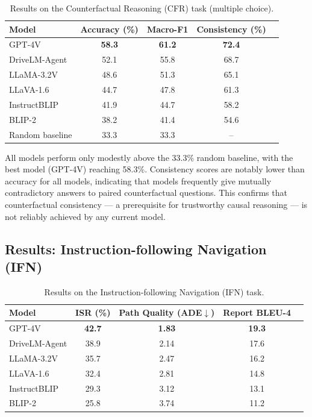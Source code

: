 \begin{table}[htbp]
  \centering
  \caption{Results on the Counterfactual Reasoning (CFR) task (multiple choice).}
  \label{tab:cfr_results}
  \small
  \begin{tabular}{lcccc}
    \toprule
    \textbf{Model} & \textbf{Accuracy (\%)} & \textbf{Macro-F1} & \textbf{Consistency (\%)} \\
    \midrule
    GPT-4V           & \textbf{58.3} & \textbf{61.2} & \textbf{72.4} \\
    DriveLM-Agent    & 52.1 & 55.8 & 68.7 \\
    LLaMA-3.2V       & 48.6 & 51.3 & 65.1 \\
    LLaVA-1.6        & 44.7 & 47.8 & 61.3 \\
    InstructBLIP     & 41.9 & 44.7 & 58.2 \\
    BLIP-2           & 38.2 & 41.4 & 54.6 \\
    Random baseline  & 33.3 & 33.3 & -- \\
    \bottomrule
  \end{tabular}
\end{table}

All models perform only modestly above the 33.3\% random baseline, with the best
model (GPT-4V) reaching 58.3\%. Consistency scores are notably lower than accuracy
for all models, indicating that models frequently give mutually contradictory answers
to paired counterfactual questions. This confirms that counterfactual consistency ---
a prerequisite for trustworthy causal reasoning --- is not reliably achieved by any
current model.

\subsection{Results: Instruction-following Navigation (IFN)}
\label{ssec:exp_ifn}

\begin{table}[htbp]
  \centering
  \caption{Results on the Instruction-following Navigation (IFN) task.}
  \label{tab:ifn_results}
  \small
  \begin{tabular}{lcccc}
    \toprule
    \textbf{Model} & \textbf{ISR (\%)} & \textbf{Path Quality (ADE$\downarrow$)} & \textbf{Report BLEU-4} \\
    \midrule
    GPT-4V           & \textbf{42.7} & \textbf{1.83} & \textbf{19.3} \\
    DriveLM-Agent    & 38.9 & 2.14 & 17.6 \\
    LLaMA-3.2V       & 35.7 & 2.47 & 16.2 \\
    LLaVA-1.6        & 32.4 & 2.81 & 14.8 \\
    InstructBLIP     & 29.3 & 3.12 & 13.1 \\
    BLIP-2           & 25.8 & 3.74 & 11.2 \\
    \bottomrule
  \end{tabular}
\end{table}

